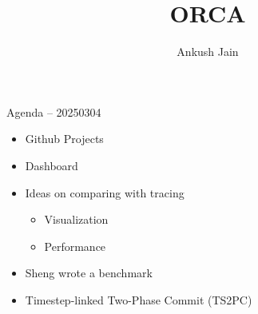 \documentclass[
  ignorenonframetext,
]{beamer}
\title{ORCA}
\author{Ankush Jain}
\date{}
\providecommand{\tightlist}{%
  \setlength{\itemsep}{0pt}\setlength{\parskip}{0pt}}\usepackage{longtable,booktabs,array}
\begin{document}
\frame{\titlepage}


\begin{frame}{Agenda -- 20250304}
\label{agenda-20250304}
\begin{itemize}
\tightlist
\item
  Github Projects
\item
  Dashboard
\item
  Ideas on comparing with tracing

  \begin{itemize}
  \tightlist
  \item
    Visualization
  \item
    Performance
  \end{itemize}
\item
  Sheng wrote a benchmark
\item
  Timestep-linked Two-Phase Commit (TS2PC)
\end{itemize}
\end{frame}
\end{document}
